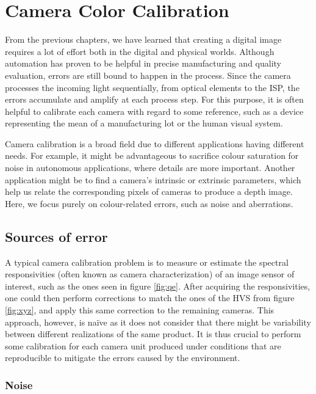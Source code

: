 \chapter{Camera Color Calibration}
\label{ch:calibration}

From the previous chapters, we have learned that creating a digital image requires a lot of effort both in the digital and physical worlds. Although automation has proven to be helpful in precise manufacturing and quality evaluation, errors are still bound to happen in the process. Since the camera processes the incoming light sequentially, from optical elements to the ISP, the errors accumulate and amplify at each process step. For this purpose, it is often helpful to calibrate each camera with regard to some reference, such as a device representing the mean of a manufacturing lot or the human visual system.

Camera calibration is a broad field due to different applications having different needs. For example, it might be advantageous to sacrifice colour saturation for noise in autonomous applications, where details are more important. Another application might be to find a camera's intrinsic or extrinsic parameters, which help us relate the corresponding pixels of cameras to produce a depth image. Here, we focus purely on colour-related errors, such as noise and aberrations.

\section{Sources of error}

A typical camera calibration problem is to measure or estimate the spectral responsivities (often known as camera characterization) of an image sensor of interest, such as the ones seen in figure \ref{fig:qe}. After acquiring the responsivities, one could then perform corrections to match the ones of the HVS from figure \ref{fig:xyz}, and apply this same correction to the remaining cameras. This approach, however, is naïve as it does not consider that there might be variability between different realizations of the same product. It is thus crucial to perform some calibration for each camera unit produced under conditions that are reproducible to mitigate the errors caused by the environment.

\subsection{Noise}


